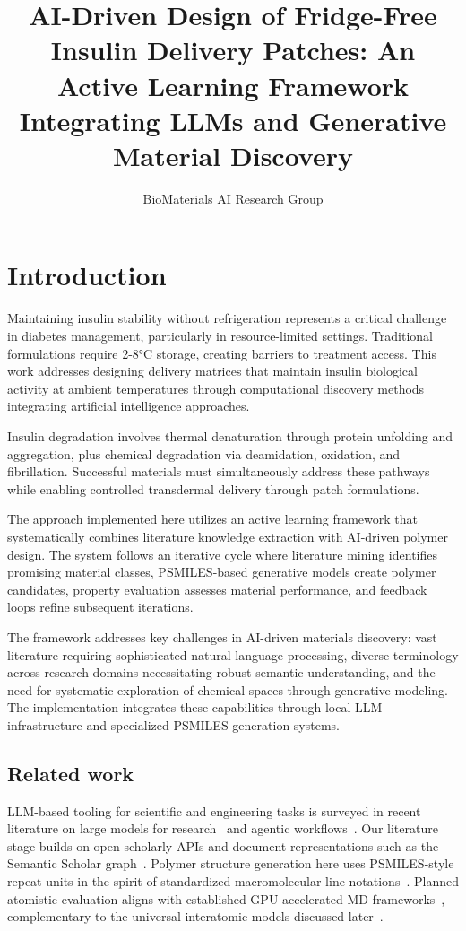 \documentclass[]{fairmeta}
\title{AI-Driven Design of Fridge-Free Insulin Delivery Patches: An Active Learning Framework Integrating LLMs and Generative Material Discovery}
\author[1]{BioMaterials AI Research Group}
\affiliation[1]{Research Institution, Department of Materials Science and Engineering}
\begin{document}
\maketitle

\section{Introduction}

Maintaining insulin stability without refrigeration represents a critical challenge in diabetes management, particularly in resource-limited settings. Traditional formulations require 2-8°C storage, creating barriers to treatment access. This work addresses designing delivery matrices that maintain insulin biological activity at ambient temperatures through computational discovery methods integrating artificial intelligence approaches.

Insulin degradation involves thermal denaturation through protein unfolding and aggregation, plus chemical degradation via deamidation, oxidation, and fibrillation. Successful materials must simultaneously address these pathways while enabling controlled transdermal delivery through patch formulations.

The approach implemented here utilizes an active learning framework that systematically combines literature knowledge extraction with AI-driven polymer design. The system follows an iterative cycle where literature mining identifies promising material classes, PSMILES-based generative models create polymer candidates, property evaluation assesses material performance, and feedback loops refine subsequent iterations.

The framework addresses key challenges in AI-driven materials discovery: vast literature requiring sophisticated natural language processing, diverse terminology across research domains necessitating robust semantic understanding, and the need for systematic exploration of chemical spaces through generative modeling. The implementation integrates these capabilities through local LLM infrastructure and specialized PSMILES generation systems.

\subsection{Related work}

LLM-based tooling for scientific and engineering tasks is surveyed in recent literature on large models for research~\cite{zhang2025llm} and agentic workflows~\cite{narayana2024agentic}. Our literature stage builds on open scholarly APIs and document representations such as the Semantic Scholar graph~\cite{semantic_scholar_api,cohan2020specter}. Polymer structure generation here uses PSMILES-style repeat units in the spirit of standardized macromolecular line notations~\cite{lin2019bigsmiles}. Planned atomistic evaluation aligns with established GPU-accelerated MD frameworks~\cite{eastman2017openmm}, complementary to the universal interatomic models discussed later~\cite{wood2025uma}.
\end{document}

